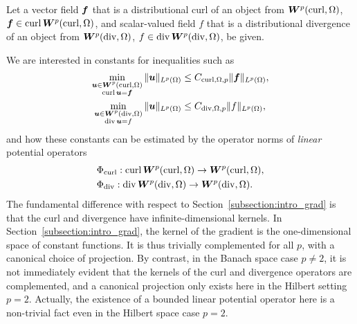 \documentclass[10pt,a4paper]{article}
\newcommand\cye[1]{%
\protect\leavevmode
\begingroup
    \color{blue}%
    #1%
\endgroup
}
\begin{document}
\cye{Let a vector field $\bm{f}$ that is a distributional curl of an object from $\bm{W}^{p}(\operatorname{curl},\Omega)$, $\bm{f} \in \operatorname{curl} \bm{W}^{p}(\operatorname{curl},\Omega)$, and scalar-valued field $f$ that is a distributional divergence of an object from $\bm{W}^{p}(\operatorname{div},\Omega)$, $f \in \operatorname{div} \bm{W}^{p}(\operatorname{div},\Omega)$, be given.} 
We are interested in constants for inequalities such as 
\begin{align}\label{math:pot_PF_curl_div}
    \min\limits_{ \substack{ \bm{u} \in \bm{W}^{p}(\operatorname{curl},\Omega) \\ \operatorname{curl} \bm{u} = \bm{f} } } 
    \| \bm{u} \|_{L^{p}(\Omega)}
    &\leq 
    C_{\operatorname{curl},\Omega,p}
    \| \bm{f} \|_{L^{p}(\Omega)} \label{math:pot_PF_curl}
    ,
    \\
    \min\limits_{ \substack{ \bm{u} \in \bm{W}^{p}(\operatorname{div},\Omega) \\ \operatorname{div} \bm{u} = f } } 
    \| \bm{u} \|_{L^{p}(\Omega)}
    &\leq 
    C_{\operatorname{div},\Omega,p}
    \| f \|_{L^{p}(\Omega)} \label{math:pot_PF_div}
    ,
\end{align}
and how these constants can be estimated by the operator norms of {\em linear} potential operators 
\begin{align*}
    &\Phi_{\operatorname{curl}} : \operatorname{curl} \bm{W}^{p}(\operatorname{curl},\Omega) \rightarrow \bm{W}^{p}(\operatorname{curl},\Omega)
    ,
    \\
    &\Phi_{\operatorname{div}} : \operatorname{div} \bm{W}^{p}(\operatorname{div},\Omega) \rightarrow \bm{W}^{p}(\operatorname{div},\Omega)
    .
\end{align*}
The fundamental difference \cye{with respect to Section~\ref{subsection:intro_grad}} is that the curl and divergence have infinite-dimensional kernels. In Section~\ref{subsection:intro_grad}, the kernel of the gradient is the one-dimensional space of constant functions. It is thus trivially complemented for all $p$, with a canonical choice of projection. By contrast, in the Banach space case $p \neq 2$, it is not immediately evident that the kernels of the curl and divergence operators are complemented, and a canonical projection only exists here in the Hilbert setting $p=2$. \cye{Actually,} the existence of a bounded linear potential operator here is a non-trivial fact even in the Hilbert space case $p = 2$. 
\end{document}
